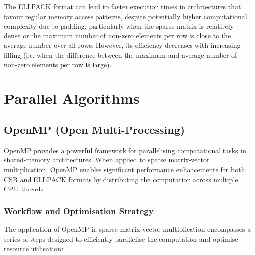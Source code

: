 \documentclass[12pt,oneside]{book} %
\begin{document}
The ELLPACK format can lead to faster execution times in architectures that
favour regular memory access patterns, despite potentially higher computational
complexity due to padding, particularly when the sparse matrix is relatively
dense or the maximum number of non-zero elements per row is close to the
average number over all rows. However, its efficiency decreases with increasing
filling (i.e. when the difference between the maximum and average number of
non-zero elements per row is large).

\newpage
\section{Parallel Algorithms}
\subsection{OpenMP (Open Multi-Processing)}

OpenMP provides a powerful framework for parallelising computational tasks in
shared-memory architectures. When applied to sparse matrix-vector
multiplication, OpenMP enables significant performance enhancements for both
CSR and ELLPACK formats by distributing the computation across multiple CPU
threads.

\subsubsection{Workflow and Optimisation Strategy}

The application of OpenMP in sparse matrix-vector multiplication encompasses a
series of steps designed to efficiently parallelise the computation and
optimise resource utilisation:
\end{document}
